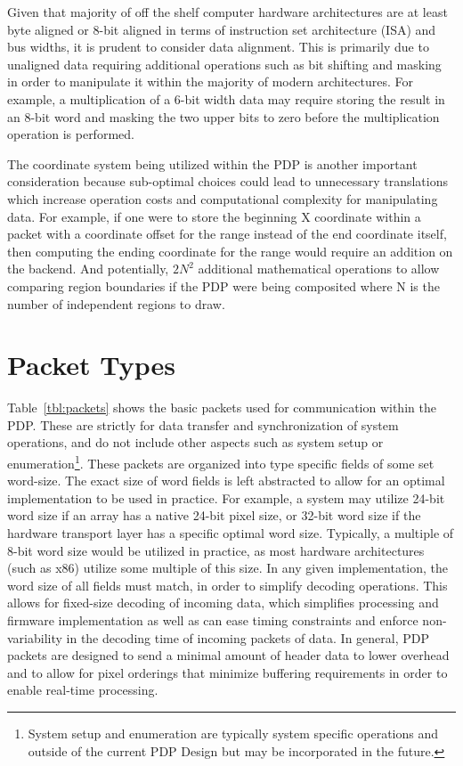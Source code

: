     Given that majority of off the shelf computer hardware architectures are at least byte aligned or 8-bit aligned in terms of instruction set architecture (ISA) and bus widths, it is prudent to consider data alignment. This is primarily due to unaligned data requiring additional operations such as bit shifting and masking in order to manipulate it within the majority of modern architectures. For example, a multiplication of a 6-bit width data may require storing the result in an 8-bit word and masking the two upper bits to zero before the multiplication operation is performed.

    The coordinate system being utilized within the PDP is another important consideration because sub-optimal choices could lead to unnecessary translations which increase operation costs and computational complexity for manipulating data. For example, if one were to store the beginning X coordinate within a packet with a coordinate offset for the range instead of the end coordinate itself, then computing the ending coordinate for the range would require an addition on the backend. And potentially, $2N^2$ additional mathematical operations to allow comparing region boundaries if the PDP were being composited where N is the number of independent regions to draw.

\section{Packet Types}
    \label{sec:packet_types}
    Table~\ref{tbl:packets} shows the basic packets used for communication within the PDP. These are strictly for data transfer and synchronization of system operations, and do not include other aspects such as system setup or enumeration\footnote{System setup and enumeration are typically system specific operations and outside of the current PDP Design but may be incorporated in the future.}. These packets are organized into type specific fields of some set word-size. The exact size of word fields is left abstracted to allow for an optimal implementation to be used in practice. For example, a system may utilize 24-bit word size if an array has a native 24-bit pixel size, or 32-bit word size if the hardware transport layer has a specific optimal word size. Typically, a multiple of 8-bit word size would be utilized in practice, as most hardware architectures (such as x86) utilize some multiple of this size\cite{HennessyEtAl2012}. In any given implementation, the word size of all fields must match, in order to simplify decoding operations. This allows for fixed-size decoding of incoming data, which simplifies processing and firmware implementation as well as can ease timing constraints and enforce non-variability in the decoding time of incoming packets of data. In general, PDP packets are designed to send a minimal amount of header data to lower overhead and to allow for pixel orderings that minimize buffering requirements in order to enable real-time processing.

